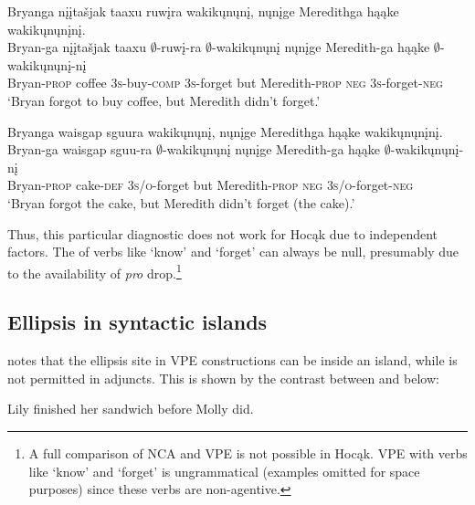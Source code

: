 \documentclass[output=paper]{LSP/langsci}
\begin{document}
 
\ea\label{ex:johnson:33}
\ea\label{ex:johnson:33a} 
\glll Bryanga {nįįtašjak taaxu} ruwįra wakikųnųnį, nųnįge Meredithga hąąke wakikųnųnįnį.\\
Bryan-ga {nįįtašjak taaxu} $\emptyset$-ruwį-ra $\emptyset$-wakikųnųnį nųnįge Meredith-ga hąąke $\emptyset$-wakikųnųnį-nį\\
Bryan-\textsc{prop} coffee \textsc{3s}-buy-\textsc{comp} \textsc{3s}-forget but Meredith-\textsc{prop} \textsc{neg} \textsc{3s}-forget-\textsc{neg}\\
\trans `Bryan forgot to buy coffee, but Meredith didn't forget.'
 
\ex\label{ex:johnson:33b} 
\glll Bryanga {waisgap sguura} wakikųnųnį, nųnįge Meredithga hąąke wakikųnųnįnį.\\
Bryan-ga {waisgap sguu-ra} $\emptyset$-wakikųnųnį nųnįge Meredith-ga hąąke $\emptyset$-wakikųnųnį-nį\\
Bryan-\textsc{prop} cake-\textsc{def} \textsc{3s/o}-forget but Meredith-\textsc{prop} \textsc{neg} \textsc{3s/o}-forget-\textsc{neg}\\
\trans `Bryan forgot the cake, but Meredith didn't forget (the cake).'
\z
\z


 
Thus, this particular diagnostic does not work for Hocąk due to independent factors. The  of verbs like `know' and `forget' can always be null, presumably due to the availability of  \emph{pro} drop.\footnote{A full comparison of NCA and VPE is not possible in Hocąk. VPE with verbs like `know' and `forget' is ungrammatical (examples omitted for space purposes) since these verbs are non-agentive.}
 

\subsection{Ellipsis in syntactic islands}\label{sec:johnson:3.3}

\citet{Goldberg2005} notes that the ellipsis site in VPE constructions can be inside an  island, while  is not permitted in adjuncts. This is shown by the contrast between  and  below:
 
\ea
\ea\label{ex:johnson:34a} 
Lily finished her sandwich before Molly did.
\label{ex:johnson:34b}
\z
\z
\end{document}
